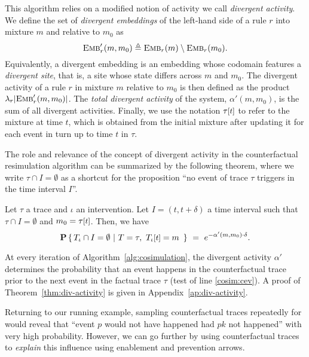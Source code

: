 This algorithm relies on a modified notion of activity we call
\emph{divergent activity}. We define the set of \emph{divergent
  embeddings} of the left-hand side of a rule $r$ into mixture $m$
and relative to $m_0$ as
\[{\textsc{Emb}}'_{r}(m, m_0) \triangleq {\textsc{Emb}}_{r}(m) \setminus {\textsc{Emb}}_{r}(m_0).\]
Equivalently, a divergent embedding is an embedding whose codomain
features a \emph{divergent site}, that is, a site whose state differs
across $m$ and $m_0$. The {divergent activity} of a rule $r$ in
mixture $m$ relative to $m_0$ is then defined as the product
$\lambda_r|{\textsc{Emb}}'_{r}(m, m_0)|$. The \emph{total divergent activity} of
the system, $\alpha'(m, m_0)$, is the sum of all divergent
activities. Finally, we use the notation $\TSTATE{t}{\tau}$ to refer
to the mixture at time $t$, which is obtained from the initial mixture
after updating it for each event in turn up to time $t$ in $\tau$.



The role and relevance of the concept of divergent activity in the
counterfactual resimulation algorithm can be summarized by the
following theorem, where we write $\tau \cap I = \emptyset$ as a
shortcut for the proposition ``no event of trace $\tau$ triggers in
the time interval $I$''.
\begin{theorem}\label{thm:div-activity}
  Let $\tau$ a trace
  and $\iota$ an intervention. Let $I = (t, t+\delta)$ a time interval
  such that $\tau \cap I = \emptyset$ and $m_0 =
  \TSTATE{t}{\tau}$. Then, we have
  \[\CProb{ \ATRAJ{} \cap I = \emptyset }{ T=\tau,\
      \TSTATE{t}{\ATRAJ{}} = m\ }
    \ =\ e^{-\alpha'(m, m_0) \cdot \delta}.
  \]
\end{theorem}
\noindent At every iteration of Algorithm~\ref{alg:cosimulation}, the
divergent activity $\alpha'$ determines the probability that an event
happens in the counterfactual trace prior to the next event in the
factual trace $\tau$ (test of line \ref{cosim:cev}).  A proof of
Theorem~\ref{thm:div-activity} is given in
Appendix~\ref{ap:div-activity}.


Returning to our running example, sampling counterfactual traces
repeatedly for \RefTrace{} would reveal that ``event $p$ would not
have happened had $pk$ not happened'' with very high probability.
However, we can go further by using counterfactual traces to
\textit{explain} this influence using enablement and prevention
arrows.
